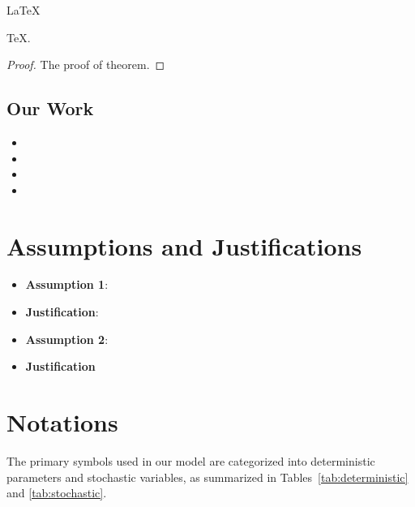 \documentclass{mcmthesis}
\begin{document}
	\begin{Theorem} \label{thm:latex}
		\LaTeX
	\end{Theorem}
	\begin{Lemma} \label{thm:tex}
		\TeX .
	\end{Lemma}
	\begin{proof}
		The proof of theorem.
	\end{proof}
	
	\subsection{Our Work}
	\lipsum[6]
	\begin{itemize}
		\item
		\item
		\item
		\item
	\end{itemize}
	
	\lipsum[7]
	
	\section{Assumptions and Justifications}
	\begin{itemize}
	\item \textbf{Assumption 1}:
	\item\textbf{Justification}:
	\item \textbf{Assumption 2}:
	\item\textbf{Justification}
	\end{itemize}
	\section{Notations}
	The primary symbols used in our model are categorized into deterministic parameters and stochastic variables, as summarized in Tables~\ref{tab:deterministic} and \ref{tab:stochastic}.
	
\end{document}
